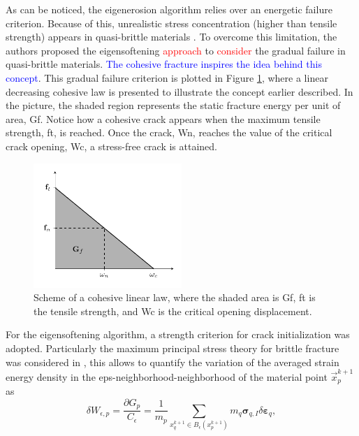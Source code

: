 \documentclass[preprint,12pt,a4paper]{elsarticle}
\newcommand{\tens}[1]{
  \ensuremath{\mathbf{{#1}}}
}
\begin{document}
As can be noticed, the eigenerosion algorithm relies over an energetic
failure criterion. Because of this, unrealistic stress
concentration (higher than tensile strength) appears in quasi-brittle
materials \cite{Navas_2017_ES}. To overcome this limitation, the authors \cite{Navas_2017_ES} proposed the eigensoftening \textcolor{red}{approach} to \textcolor{red}{consider} the gradual failure in quasi-brittle materials. \textcolor{blue}{The cohesive fracture inspires the idea behind this concept}. This gradual
failure criterion is plotted in Figure \ref{fig:Damage-ft-wc}, where
a linear decreasing cohesive law is presented to illustrate the
concept earlier described. In the picture, the shaded region represents
the static fracture energy per unit of area, \gls{Gf}. Notice how a
cohesive crack appears when the maximum tensile strength, \gls{ft}, is
reached. Once the crack, \gls{Wn}, reaches the value of the critical
crack opening, \gls{Wc}, a stress-free crack is attained.
\begin{figure}
  \centering
  \includegraphics[width=0.5\textwidth]{Figure-Damage}
  \caption{Scheme of a cohesive linear law, where the shaded area is
    \gls{Gf}, \gls{ft} is the tensile strength, and \gls{Wc} is the critical
    opening displacement.}
  \label{fig:Damage-ft-wc}
\end{figure}
For the eigensoftening algorithm, a strength criterion for crack
initialization was adopted. Particularly the maximum principal stress
theory for brittle fracture was considered in \cite{Navas_2017_ES},
this allows to quantify the variation of the averaged strain energy density in the
\gls{eps-neighborhood}-neighborhood of the material point $\vec{x}_p^{k+1}$ as
\begin{equation}
  \label{eq:variation-averaged-strain-energy-density}
  \delta W_{\epsilon,p} = \frac{\partial G_p}{C_{\epsilon}} =
  \frac{1}{m_p} \sum_{x_q^{k+1} \in
  B_{\epsilon}(x_p^{k+1})} m_q \tens{\sigma}_{q,I} \delta \tens{\varepsilon}_q,
\end{equation}
\end{document}
